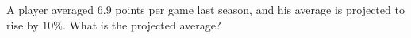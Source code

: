 A player averaged $6.9$ points per game last season, and his average is projected to rise by $10\%$. What is the projected average?
